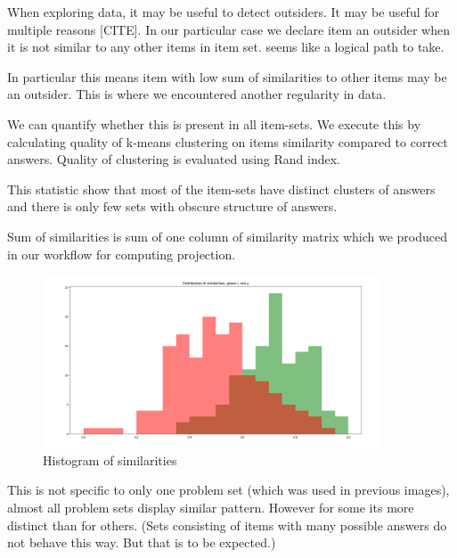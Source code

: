 \documentclass[
  digital, %
  table,   %
  nolof,     %
  nolot,     %
  nocover
]{fithesis3}
\begin{document}

When exploring data, it may be useful to detect outsiders. It may be
useful for multiple reasons [CITE]. In our particular case we
declare item an outsider when it is not similar to any other items in
item set. seems like a logical path to take.

In particular this means item with low sum of similarities to other
items may be an outsider. This is where we encountered another
regularity in data.


We can quantify whether this is present in all item-sets. We execute this by calculating quality of k-means clustering on items similarity compared to correct answers. Quality of clustering is evaluated using Rand index.

This statistic show that most of the item-sets have distinct clusters of answers and there is only few sets with obscure structure of answers.


Sum of similarities is sum of one column of similarity matrix which we
produced in our workflow for computing projection.

\begin{figure}
  \begin{center}
    \includegraphics[width=10cm]{img/iy_histogram}
  \end{center}
  \caption{Histogram of similarities}
  \label{ref:iyhistogram}
\end{figure}



This is not specific to only one problem set (which was used in previous
images), almost all problem sets display similar pattern. However for
some its more distinct than for others. (Sets consisting of items with
many possible answers do not behave this way. But that is to be
expected.)
\end{document}
